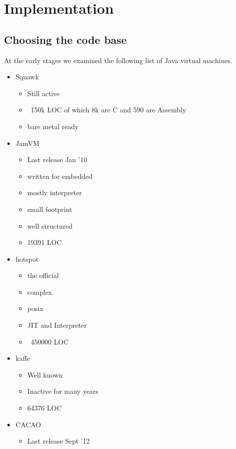 \documentclass[
a4paper,
12pt,
]{report}
\newcommand{\java}{Java\texttrademark\xspace}
\begin{document}
\chapter{Implementation}
\label{cha:implementation}

\section{Choosing the code base}

At the early stages we examined the following list of \java virtual
machines.

\begin{itemize}
\item Squawk
  \begin{itemize}
  \item Still active
  \item ~150k LOC of which 8k are C and 590 are Assembly
  \item bare metal ready
  \end{itemize}
\item JamVM
  \begin{itemize}
  \item Last release Jan '10
  \item written for embedded
  \item mostly interpreter
  \item small footprint
  \item well structured
  \item 19391 LOC
  \end{itemize}
\item hotspot
  \begin{itemize}
  \item the official
  \item complex
  \item posix
  \item JIT and Interpreter
  \item ~450000 LOC
  \end{itemize}
\item kaffe
  \begin{itemize}
  \item Well known
  \item Inactive for many years
  \item 64376 LOC
  \end{itemize}
\item CACAO
  \begin{itemize}
  \item Last release Sept '12

\end{itemize}
\end{itemize}
\end{document}
